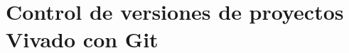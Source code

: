 \documentclass[11pt,letterpaper,oneside]{phstylee}
\begin{document}
\chapter{Control de versiones de proyectos Vivado con Git}
\label{cap:git}





\end{document}
